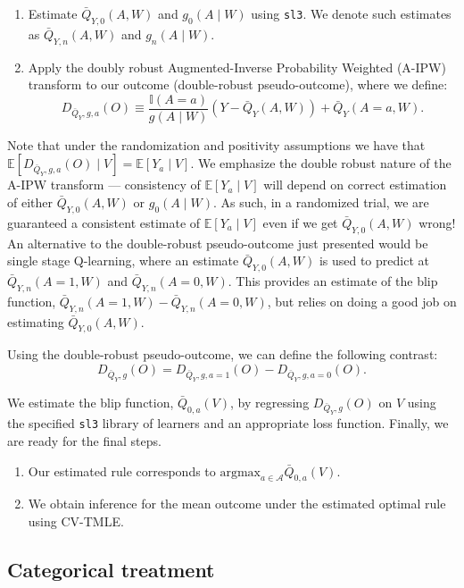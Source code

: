 \documentclass[
  12pt, krantz2,
]{krantz}
\newcommand{\passthrough}[1]{#1}
\providecommand{\tightlist}{%
  \setlength{\itemsep}{0pt}\setlength{\parskip}{0pt}}
\newcommand{\E}{\mathbb{E}}
\newcommand{\1}{\mathbbm{1}}
\theoremstyle{definition}
\theoremstyle{definition}
\theoremstyle{definition}
\theoremstyle{definition}
\theoremstyle{remark}
\begin{document}
\begin{enumerate}
\def\labelenumi{\arabic{enumi}.}
\tightlist
\item
  Estimate \(\bar{Q}_{Y,0}(A,W)\) and \(g_0(A \mid W)\) using \passthrough{\lstinline!sl3!}. We denote such
  estimates as \(\bar{Q}_{Y,n}(A,W)\) and \(g_n(A \mid W)\).
\item
  Apply the doubly robust Augmented-Inverse Probability Weighted (A-IPW)
  transform to our outcome (double-robust pseudo-outcome), where we define:
  \[D_{\bar{Q}_Y,g,a}(O) \equiv \frac{\mathbb{I}(A=a)}{g(A \mid W)} (Y -
  \bar{Q}_Y(A,W)) + \bar{Q}_Y(A=a,W).\]
\end{enumerate}

Note that under the randomization and positivity assumptions we have that
\(\E[D_{\bar{Q}_Y,g,a}(O) \mid V] = \E[Y_a \mid V]\). We emphasize the double
robust nature of the A-IPW transform --- consistency of \(\E[Y_a \mid V]\) will depend
on correct estimation of either \(\bar{Q}_{Y,0}(A,W)\) or \(g_0(A \mid W)\). As
such, in a randomized trial, we are guaranteed a consistent estimate of \(\E[Y_a \mid V]\)
even if we get \(\bar{Q}_{Y,0}(A,W)\) wrong! An alternative to the double-robust pseudo-outcome
just presented would be single stage Q-learning, where an estimate \(\bar{Q}_{Y,0}(A,W)\)
is used to predict at \(\bar{Q}_{Y,n}(A=1,W)\) and \(\bar{Q}_{Y,n}(A=0,W)\). This provides
an estimate of the blip function, \(\bar{Q}_{Y,n}(A=1,W) - \bar{Q}_{Y,n}(A=0,W)\), but
relies on doing a good job on estimating \(\bar{Q}_{Y,0}(A,W)\).

Using the double-robust pseudo-outcome, we can define the following contrast:
\[D_{\bar{Q}_Y,g}(O) = D_{\bar{Q}_Y, g, a=1}(O) - D_{\bar{Q}_Y, g, a=0}(O).\]

We estimate the blip function, \(\bar{Q}_{0,a}(V)\), by regressing
\(D_{\bar{Q}_Y,g}(O)\) on \(V\) using the specified \passthrough{\lstinline!sl3!} library of learners and an
appropriate loss function. Finally, we are ready for the final steps.

\begin{enumerate}
\def\labelenumi{\arabic{enumi}.}
\setcounter{enumi}{2}
\item
  Our estimated rule corresponds to \(\text{argmax}_{a \in \mathcal{A}} \bar{Q}_{0,a}(V)\).
\item
  We obtain inference for the mean outcome under the estimated optimal rule
  using CV-TMLE.
\end{enumerate}

\hypertarget{categorical-treatment}{%
\subsection{Categorical treatment}\label{categorical-treatment}}
\end{document}
